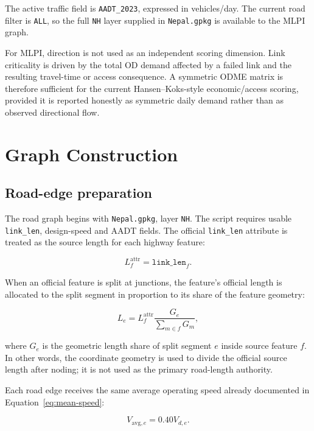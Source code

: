 \documentclass[11pt,a4paper]{article}
\begin{document}
The active traffic field is \texttt{AADT\_2023}, expressed in vehicles/day.
The current road filter is
\texttt{ALL}, so the full \texttt{NH} layer supplied in \texttt{Nepal.gpkg} is
available to the MLPI graph.

For MLPI, direction is not used as an independent scoring dimension. Link
criticality is driven by the total OD demand affected by a failed link and the
resulting travel-time or access consequence. A symmetric ODME matrix is
therefore sufficient for the current Hansen--Koks-style economic/access
scoring, provided it is reported honestly as symmetric daily demand rather than
as observed directional flow.

\section{Graph Construction}

\subsection{Road-edge preparation}

The road graph begins with \texttt{Nepal.gpkg}, layer \texttt{NH}. The script
requires usable \texttt{link\_len}, design-speed and AADT fields. The official
\texttt{link\_len} attribute is treated as the source length for each highway
feature:

\begin{equation}
L_f^{\mathrm{attr}}=\texttt{link\_len}_f .
\label{eq:mlpi-edge-length}
\end{equation}

When an official feature is split at junctions, the feature's official length
is allocated to the split segment in proportion to its share of the feature
geometry:

\begin{equation}
L_e=L_f^{\mathrm{attr}}
\frac{G_e}{\sum_{m\in f}G_m},
\label{eq:mlpi-segment-length}
\end{equation}

where $G_e$ is the geometric length share of split segment $e$ inside source
feature $f$. In other words, the coordinate geometry is used to divide the
official source length after noding; it is not used as the primary road-length
authority.

Each road edge receives the same average operating speed already documented in
Equation~\ref{eq:mean-speed}:

\begin{equation}
V_{\mathrm{avg},e} = 0.40 V_{d,e}.
\label{eq:mlpi-speed}
\end{equation}
\end{document}
